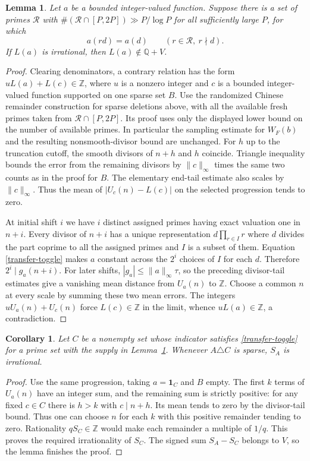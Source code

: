 \documentclass[11pt,letterpaper]{article}
\newtheorem{corollary}[theorem]{Corollary}
\newtheorem{lemma}[theorem]{Lemma}
\begin{document}
\begin{lemma}\label{lem:sparsetransfer}
Let $a$ be a bounded integer-valued function. Suppose there is a set
of primes $\mathcal R$ with $\#(\mathcal R\cap[P,2P])\gg P/\log P$
for all sufficiently large $P$, for which
\begin{equation}\label{transfer-toggle}
 a(rd)=a(d)\qquad(r\in\mathcal R,\ r\nmid d).
\end{equation}
If $L(a)$ is irrational, then $L(a)\notin\mathbb Q+V$.
\end{lemma}
\begin{proof}
Clearing denominators, a contrary relation has the form
$uL(a)+L(c)\in\mathbb Z$, where $u$ is a nonzero integer and $c$ is a
bounded integer-valued function supported on one sparse set $B$.
Use the randomized Chinese remainder construction for sparse deletions
above, with all the available fresh primes taken from
$\mathcal R\cap[P,2P]$. Its proof uses only the displayed lower bound
on the number of available primes. In particular the sampling estimate
for $W_F(b)$ and the resulting nonsmooth-divisor bound are unchanged.
For $h$ up to the truncation cutoff, the smooth divisors of $n+h$
and $h$ coincide. Triangle inequality bounds the error from the remaining
divisors by $\|c\|_\infty$ times the same two counts as in the proof for
$B$. The elementary end-tail estimate also scales by $\|c\|_\infty$.
Thus the mean of $|U_c(n)-L(c)|$ on the selected progression tends to zero.

At initial shift $i$ we have $i$ distinct assigned primes having exact
valuation one in $n+i$. Every divisor of $n+i$ has a unique representation
$d\prod_{r\in I}r$ where $d$ divides the part coprime to all the assigned
primes and $I$ is a subset of them. Equation \eqref{transfer-toggle}
makes $a$ constant across the $2^i$ choices of $I$ for each $d$.
Therefore $2^i\mid g_a(n+i)$. For later shifts, $|g_a|\le
\|a\|_\infty\tau$, so the preceding divisor-tail estimates give a
vanishing mean distance from $U_a(n)$ to $\mathbb Z$. Choose a common
$n$ at every scale by summing these two mean errors.
The integers $uU_a(n)+U_c(n)$ force $L(c)\in\mathbb Z$ in the limit,
whence $uL(a)\in\mathbb Z$, a contradiction.
\end{proof}

\begin{corollary}\label{cor:togglesupp}
Let $C$ be a nonempty set whose indicator satisfies \eqref{transfer-toggle}
for a prime set with the supply in Lemma~\ref{lem:sparsetransfer}.
Whenever $A\triangle C$ is sparse, $S_A$ is irrational.
\end{corollary}
\begin{proof}
Use the same progression, taking $a=\mathbf1_C$ and $B$ empty. The
first $k$ terms of $U_a(n)$ have an integer sum, and the remaining
sum is strictly positive: for any fixed $c\in C$ there is $h>k$ with
$c\mid n+h$. Its mean tends to zero by the divisor-tail bound. Thus
one can choose $n$ for each $k$ with this positive remainder tending
to zero. Rationality $qS_C\in\mathbb Z$ would make each remainder a
multiple of $1/q$. This proves the required irrationality of $S_C$.
The signed sum $S_A-S_C$ belongs to $V$, so the lemma finishes the proof.
\end{proof}
\end{document}
